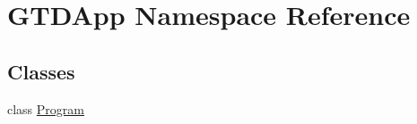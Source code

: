 \hypertarget{namespace_g_t_d_app}{}\section{G\+T\+D\+App Namespace Reference}
\label{namespace_g_t_d_app}
\subsection*{Classes}
\begin{DoxyCompactItemize}
\item 
class \mbox{\hyperlink{class_g_t_d_app_1_1_program}{Program}}
\end{DoxyCompactItemize}
